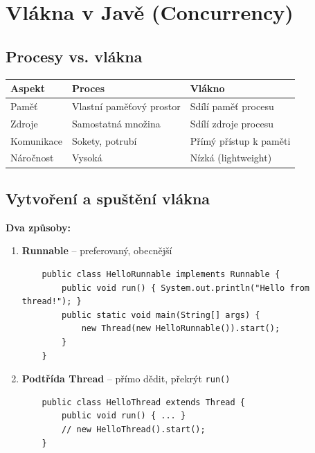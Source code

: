 \documentclass[11pt,a4paper]{article}
\begin{document}
\section{Vlákna v Javě (Concurrency)}

\subsection{Procesy vs. vlákna}

\begin{center}
\begin{tabular}{>{\raggedright}p{3cm} >{\raggedright}p{5cm} >{\raggedright\arraybackslash}p{5cm}}
\toprule
\textbf{Aspekt} & \textbf{Proces} & \textbf{Vlákno} \\
\midrule
Paměť & Vlastní paměťový prostor & Sdílí paměť procesu \\
Zdroje & Samostatná množina & Sdílí zdroje procesu \\
Komunikace & Sokety, potrubí & Přímý přístup k paměti \\
Náročnost & Vysoká & Nízká (lightweight) \\
\bottomrule
\end{tabular}
\end{center}

\subsection{Vytvoření a spuštění vlákna}

\textbf{Dva způsoby:}

\begin{enumerate}
    \item \textbf{Runnable} -- preferovaný, obecnější
    \begin{verbatim}
    public class HelloRunnable implements Runnable {
        public void run() { System.out.println("Hello from thread!"); }
        public static void main(String[] args) {
            new Thread(new HelloRunnable()).start();
        }
    }
    \end{verbatim}
    
    \item \textbf{Podtřída Thread} -- přímo dědit, překrýt \texttt{run()}
    \begin{verbatim}
    public class HelloThread extends Thread {
        public void run() { ... }
        // new HelloThread().start();
    }
    \end{verbatim}
\end{enumerate}
\end{document}
